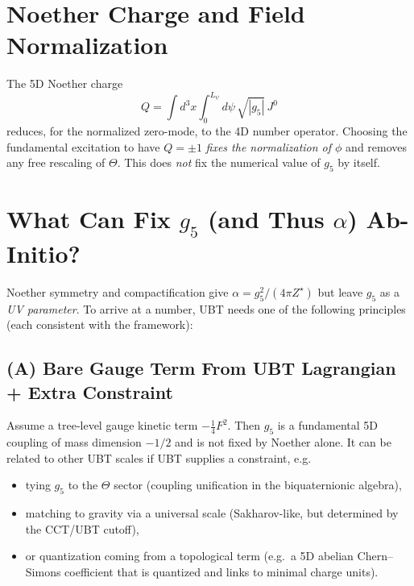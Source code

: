 \documentclass[12pt]{article}
\begin{document}
\section{Noether Charge and Field Normalization}
The 5D Noether charge
\begin{equation}
Q = \int d^3x \int_0^{L_\psi}\! d\psi \,\sqrt{|g_5|}\, J^0
\end{equation}
reduces, for the normalized zero-mode, to the 4D number operator. Choosing the fundamental excitation to have $Q=\pm1$ \emph{fixes the normalization of $\phi$} and removes any free rescaling of $\Theta$. This does \emph{not} fix the numerical value of $g_5$ by itself.

\section{What Can Fix $g_5$ (and Thus $\alpha$) Ab-Initio?}
Noether symmetry and compactification give $\alpha = g_5^2/(4\pi Z^\star)$ but leave $g_5$ as a \emph{UV parameter}. To arrive at a number, UBT needs one of the following principles (each consistent with the framework):

\subsection*{(A) Bare Gauge Term From UBT Lagrangian + Extra Constraint}
Assume a tree-level gauge kinetic term $-\tfrac14 F^2$. Then $g_5$ is a fundamental 5D coupling of mass dimension $-1/2$ and is not fixed by Noether alone. It can be related to other UBT scales if UBT supplies a constraint, e.g.
\begin{itemize}
\item tying $g_5$ to the $\Theta$ sector (coupling unification in the biquaternionic algebra),
\item matching to gravity via a universal scale (Sakharov-like, but determined by the CCT/UBT cutoff),
\item or quantization coming from a topological term (e.g.\ a 5D abelian Chern--Simons coefficient that is quantized and links to minimal charge units).
\end{itemize}
\end{document}
